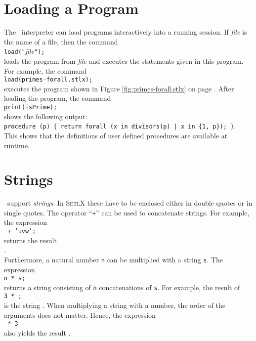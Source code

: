 \section{Loading a Program}
The \setlx\ interpreter can load programs interactively into a running session.
If \textsl{file} is the name of a file, then the command
\\[0.2cm]
\hspace*{1.3cm}
\texttt{load("}\textsl{file}\texttt{");}
\\[0.2cm]
loads the program from  \textsl{file} and executes the statements given in this program.
For example, the command
\\[0.2cm]
\hspace*{1.3cm}
\texttt{load(primes-forall.stlx);}
\\[0.2cm]
executes the program shown in Figure
\ref{fig:primes-forall.stlx} on page \pageref{fig:primes-forall.stlx}.
After loading the program, the command
\\[0.2cm]
\hspace*{1.3cm}
\texttt{print(isPrime);}
\\[0.2cm]
shows the following output:
\\[0.2cm]
\hspace*{1.3cm}
\texttt{procedure (p) \{ return forall (x in divisors(p) | x in \{1, p\}); \}}.
\\[0.2cm]
This shows that the definitions of user defined procedures are available at runtime.

\section{Strings}
\setlx\ support \emph{strings}.  In  \textsc{SetlX} these have to be enclosed either in double quotes or in
single quotes.  The operator ``\texttt{+}'' can be used to concatenate strings.  For example, the expression
\\[0.2cm]
\hspace*{1.3cm}
\texttt{ + \texttt{'uvw'};}
\\[0.2cm]
returns the result
\\[0.2cm]
\hspace*{1.3cm}
.
\\[0.2cm]
Furthermore, a natural number \texttt{n} can be multiplied with a string \texttt{s}.  The expression
\\[0.2cm]
\hspace*{1.3cm}
\texttt{n * s;}
\\[0.2cm]
returns a string consisting of \texttt{n} concatenations of \texttt{s}.  For example,
the result of
\\[0.2cm]
\hspace*{1.3cm}
\texttt{3 * ;}
\\[0.2cm]
is the string .  When multiplying a string with a number, the order of the
arguments does not matter. Hence, the expression
\\[0.2cm]
\hspace*{1.3cm}
\texttt{ * 3}
\\[0.2cm]
also yields the result .

